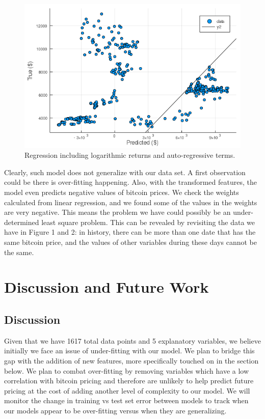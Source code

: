 \documentclass[9pt,twocolumn,twoside]{ilcss}
\begin{document}
\begin{figure}[tbhp]
\centering
\includegraphics[width=1.0\linewidth]{Regression_w_all_explanatory.png}
\caption{Regression including logarithmic returns and auto-regressive terms.}
\label{fig:10}
\end{figure}

Clearly, such model does not generalize with our data set. A first observation could be there is over-fitting happening. Also, with the transformed features, the model even predicts negative values of bitcoin prices. We check the weights calculated from linear regression, and we found some of the values in the weights are very negative. This means the problem we have could possibly be an under-determined least square problem. This can be revealed by revisiting the data we have in Figure 1 and 2: in history, there can be more than one date that has the same bitcoin price, and the values of other variables during these days cannot be the same. 

\section{Discussion and Future Work}
\subsection*{Discussion}
Given that we have 1617 total data points and 5 explanatory variables, we believe initially we face an issue of under-fitting with our model. We plan to bridge this gap with the addition of new features, more specifically touched on in the section below. We plan to combat over-fitting by removing variables which have a low correlation with bitcoin pricing and therefore are unlikely to help predict future pricing at the cost of adding another level of complexity to our model. We will monitor the change in training vs test set error between models to track when our models appear to be over-fitting versus when they are generalizing.
\end{document}
